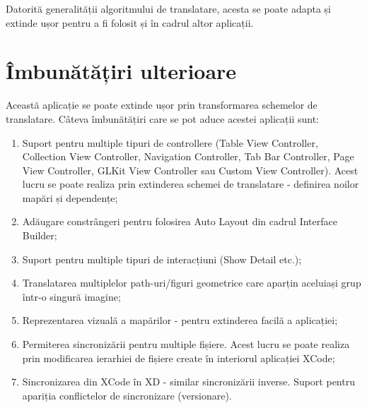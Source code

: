 Datorită generalității algoritmului de translatare, acesta se poate adapta și extinde ușor pentru a fi folosit și în cadrul altor aplicații.

\section{Îmbunătățiri ulterioare}

Această aplicație se poate extinde ușor prin transformarea schemelor de translatare.
Câteva îmbunătățiri care se pot aduce acestei aplicații sunt:

\begin{enumerate}
\item Suport pentru multiple tipuri de controllere (Table View Controller, Collection View Controller, Navigation Controller, Tab Bar Controller, Page View Controller, GLKit View Controller sau Custom View Controller). Acest lucru se poate realiza prin extinderea schemei de translatare - definirea noilor mapări și dependențe;
\item Adăugare constrângeri pentru folosirea Auto Layout din cadrul Interface Builder;
\item Suport pentru multiple tipuri de interacțiuni (Show Detail etc.);
\item Translatarea multiplelor path-uri/figuri geometrice care aparțin aceluiași grup într-o singură imagine;
\item Reprezentarea vizuală a mapărilor - pentru extinderea facilă a aplicației;
\item Permiterea sincronizării pentru multiple fișiere. Acest lucru se poate realiza prin modificarea ierarhiei de fișiere create în interiorul aplicației XCode;
\item Sincronizarea din XCode în XD - similar sincronizării inverse. Suport pentru apariția conflictelor de sincronizare (versionare).
\end{enumerate}


